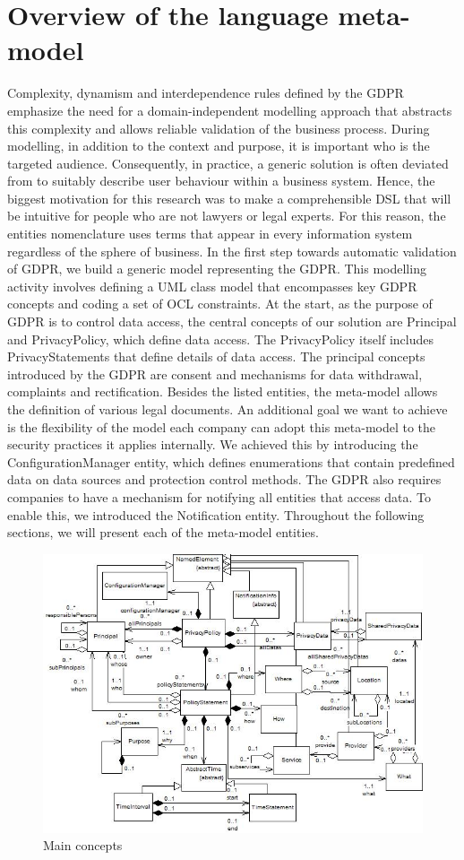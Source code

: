 \documentclass[11pt,english]{article}
\begin{document}
\section{Overview of the language meta-model}
Complexity, dynamism and interdependence rules defined by the GDPR emphasize the need for a domain-independent modelling approach that abstracts this complexity and allows reliable validation of the business process. During modelling, in addition to the context and purpose, it is important who is the targeted audience. Consequently, in practice, a generic solution is often deviated from to suitably describe user behaviour within a business system. Hence, the biggest motivation for this research was to make a comprehensible DSL that will be intuitive for people who are not lawyers or legal experts. For this reason, the entities nomenclature uses terms that appear in every information system regardless of the sphere of business. In the first step towards automatic validation of GDPR, we build a generic model representing the GDPR. This modelling activity involves defining a UML class model that encompasses key GDPR concepts and coding a set of OCL constraints. At the start, as the purpose of GDPR is to control data access, the central concepts of our solution are Principal and PrivacyPolicy, which define data access. The PrivacyPolicy itself includes PrivacyStatements that define details of data access. The principal concepts introduced by the GDPR are consent and mechanisms for data withdrawal, complaints and rectification. Besides the listed entities, the meta-model allows the definition of various legal documents. An additional goal we want to achieve is the flexibility of the model each company can adopt this meta-model to the security practices it applies internally. We achieved this by introducing the ConfigurationManager entity, which defines enumerations that contain predefined data on data sources and protection control methods. The GDPR also requires companies to have a mechanism for notifying all entities that access data. To enable this, we introduced the Notification entity. Throughout the following sections, we will present each of the meta-model entities.
\begin{figure}[H]
    \centering
    \includegraphics[width=12.5cm]{images/mainconcepts.jpg}
    \caption{Main concepts}
    \label{fig:mainconcepts}
\end{figure}
\end{document}
